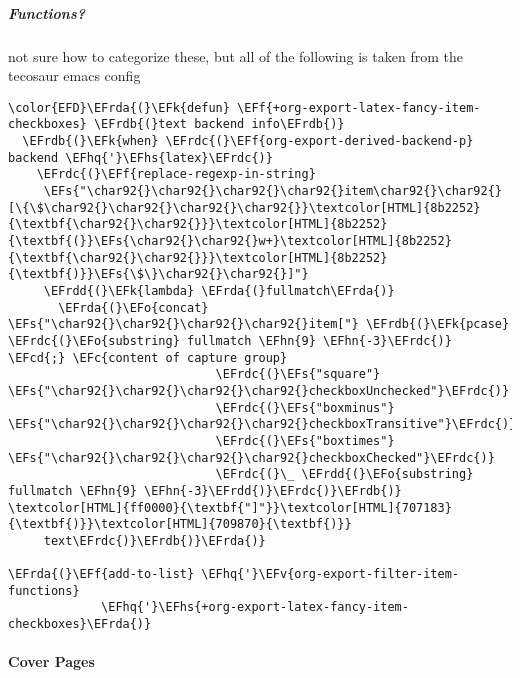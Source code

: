 \documentclass{article}
\newcommand{\EFc}[1]{\textcolor{EFc}{#1}} %
\newcommand{\EFcd}[1]{\textcolor{EFcd}{#1}} %
\newcommand{\EFs}[1]{\textcolor{EFs}{#1}} %
\newcommand{\EFk}[1]{\textcolor{EFk}{#1}} %
\newcommand{\EFf}[1]{\textcolor{EFf}{#1}} %
\newcommand{\EFv}[1]{\textcolor{EFv}{#1}} %
\newcommand{\EFo}[1]{\textcolor{EFo}{#1}} %
\newcommand{\EFhn}[1]{\textcolor{EFhn}{\textbf{#1}}} %
\newcommand{\EFhq}[1]{#1} %
\newcommand{\EFhs}[1]{\textcolor{EFhs}{#1}} %
\newcommand{\EFrda}[1]{\textcolor{EFrda}{#1}} %
\newcommand{\EFrdb}[1]{\textcolor{EFrdb}{#1}} %
\newcommand{\EFrdc}[1]{\textcolor{EFrdc}{#1}} %
\newcommand{\EFrdd}[1]{\textcolor{EFrdd}{#1}} %
\begin{document}
\subparagraph{Functions?}
\label{sec:org249f427}
not sure how to categorize these, but all of the following is taken from the tecosaur emacs config
\begin{Code}
\begin{Verbatim}
\color{EFD}\EFrda{(}\EFk{defun} \EFf{+org-export-latex-fancy-item-checkboxes} \EFrdb{(}text backend info\EFrdb{)}
  \EFrdb{(}\EFk{when} \EFrdc{(}\EFf{org-export-derived-backend-p} backend \EFhq{'}\EFhs{latex}\EFrdc{)}
    \EFrdc{(}\EFf{replace-regexp-in-string}
     \EFs{"\char92{}\char92{}\char92{}\char92{}item\char92{}\char92{}[\{\$\char92{}\char92{}\char92{}\char92{}}\textcolor[HTML]{8b2252}{\textbf{\char92{}\char92{}}}\textcolor[HTML]{8b2252}{\textbf{(}}\EFs{\char92{}\char92{}w+}\textcolor[HTML]{8b2252}{\textbf{\char92{}\char92{}}}\textcolor[HTML]{8b2252}{\textbf{)}}\EFs{\$\}\char92{}\char92{}]"}
     \EFrdd{(}\EFk{lambda} \EFrda{(}fullmatch\EFrda{)}
       \EFrda{(}\EFo{concat} \EFs{"\char92{}\char92{}\char92{}\char92{}item["} \EFrdb{(}\EFk{pcase} \EFrdc{(}\EFo{substring} fullmatch \EFhn{9} \EFhn{-3}\EFrdc{)} \EFcd{;} \EFc{content of capture group}
                             \EFrdc{(}\EFs{"square"}   \EFs{"\char92{}\char92{}\char92{}\char92{}checkboxUnchecked"}\EFrdc{)}
                             \EFrdc{(}\EFs{"boxminus"} \EFs{"\char92{}\char92{}\char92{}\char92{}checkboxTransitive"}\EFrdc{)}
                             \EFrdc{(}\EFs{"boxtimes"} \EFs{"\char92{}\char92{}\char92{}\char92{}checkboxChecked"}\EFrdc{)}
                             \EFrdc{(}\_ \EFrdd{(}\EFo{substring} fullmatch \EFhn{9} \EFhn{-3}\EFrdd{)}\EFrdc{)}\EFrdb{)} \textcolor[HTML]{ff0000}{\textbf{"]"}}\textcolor[HTML]{707183}{\textbf{)}}\textcolor[HTML]{709870}{\textbf{)}}
     text\EFrdc{)}\EFrdb{)}\EFrda{)}

\EFrda{(}\EFf{add-to-list} \EFhq{'}\EFv{org-export-filter-item-functions}
             \EFhq{'}\EFhs{+org-export-latex-fancy-item-checkboxes}\EFrda{)}

\end{Verbatim}
\end{Code}




\paragraph{Cover Pages}
\label{sec:orgb279251}
\end{document}
